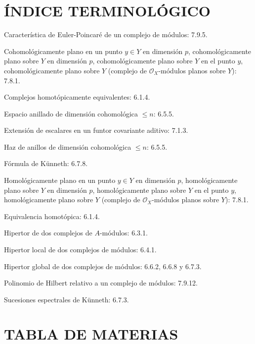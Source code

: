 \clearpage
{}
\section*{ÍNDICE TERMINOLÓGICO}

\begin{flushleft}
Característica de Euler-Poincaré de un complejo de módulos: 7.9.5.

\medskip
Cohomológicamente plano en un punto $y\in Y$ en dimensión $p$,
cohomológicamente plano sobre $Y$ en dimensión $p$, cohomológicamente plano
sobre $Y$ en el punto $y$, cohomológicamente plano sobre $Y$ (complejo de
$\mathscr O_X$-módulos planos sobre $Y$): 7.8.1.

\medskip
Complejos homotópicamente equivalentes: 6.1.4.

\medskip
Espacio anillado de dimensión cohomológica $\leq n$: 6.5.5.

\medskip
Extensión de escalares en un funtor covariante aditivo: 7.1.3.

\medskip
Haz de anillos de dimensión cohomológica $\leq n$: 6.5.5.

\medskip
Fórmula de Künneth: 6.7.8.

\medskip
Homológicamente plano en un punto $y\in Y$ en dimensión $p$,
homológicamente plano sobre $Y$ en dimensión $p$, homológicamente plano sobre
$Y$ en el punto $y$, homológicamente plano sobre $Y$ (complejo de
$\mathscr O_X$-módulos planos sobre $Y$): 7.8.1.

\medskip
Equivalencia homotópica: 6.1.4.

\medskip
Hipertor de dos complejos de $A$-módulos: 6.3.1.

\medskip
Hipertor local de dos complejos de módulos: 6.4.1.

\medskip
Hipertor global de dos complejos de módulos: 6.6.2, 6.6.8 y 6.7.3.

\medskip
Polinomio de Hilbert relativo a un complejo de módulos: 7.9.12.

\medskip
Sucesiones espectrales de Künneth: 6.7.3.
\end{flushleft}

\clearpage
{}
\section*{TABLA DE MATERIAS}


